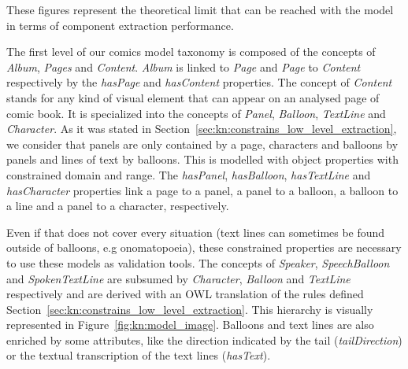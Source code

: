 These figures represent the theoretical limit that can be reached with the model in terms of component extraction performance.


The first level of our comics model taxonomy is composed of the concepts of \textit{Album}, \textit{Pages} and \textit{Content}.
\textit{Album} is linked to \textit{Page} and \textit{Page} to \textit{Content} respectively by the \textit{hasPage} and \textit{hasContent} properties.
The concept of \textit{Content} stands for any kind of visual element that can appear on an analysed page of comic book.
It is specialized into the concepts of \textit{Panel}, \textit{Balloon}, \textit{TextLine} and \textit{Character}.
As it was stated in Section~\ref{sec:kn:constrains_low_level_extraction}, we consider that panels are only contained by a page, characters and balloons by panels and lines of text by balloons.
This is modelled with object properties with constrained domain and range.
The \textit{hasPanel}, \textit{hasBalloon}, \textit{hasTextLine} and \textit{hasCharacter} properties link a page to a panel, a panel to a balloon, a balloon to a line and a panel to a character, respectively.

Even if that does not cover every situation (text lines can sometimes be found outside of balloons, e.g onomatopoeia), these constrained properties are necessary to use these models as validation tools.
The concepts of \textit{Speaker}, \textit{SpeechBalloon} and \textit{SpokenTextLine} are subsumed by \textit{Character}, \textit{Balloon} and \textit{TextLine} respectively and are derived with an OWL translation of the rules defined Section~\ref{sec:kn:constrains_low_level_extraction}.
This hierarchy is visually represented in Figure~\ref{fig:kn:model_image}.
Balloons and text lines are also enriched by some attributes, like the direction indicated by the tail (\textit{tailDirection}) or the textual transcription of the text lines (\textit{hasText}).

